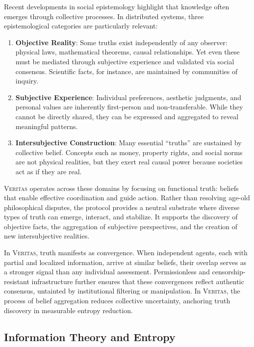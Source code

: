 \documentclass[11pt,a4paper]{article}
\newcommand{\veritas}{\textsc{Veritas}}
\begin{document}
Recent developments in social epistemology \cite{goldman1987foundations,goldman1999knowledge,kitcher1990division} highlight that knowledge often emerges through collective processes. In distributed systems, three epistemological categories are particularly relevant:

\begin{enumerate}
\item \textbf{Objective Reality}: Some truths exist independently of any observer: physical laws, mathematical theorems, causal relationships. Yet even these must be mediated through subjective experience and validated via social consensus. Scientific facts, for instance, are maintained by communities of inquiry.

\item \textbf{Subjective Experience}: Individual preferences, aesthetic judgments, and personal values are inherently first-person and non-transferable. While they cannot be directly shared, they can be expressed and aggregated to reveal meaningful patterns.

\item \textbf{Intersubjective Construction}: Many essential ``truths'' are sustained by collective belief. Concepts such as money, property rights, and social norms are not physical realities, but they exert real causal power because societies act as if they are real.
\end{enumerate}

\veritas{} operates across these domains by focusing on functional truth: beliefs that enable effective coordination and guide action. Rather than resolving age-old philosophical disputes, the protocol provides a neutral substrate where diverse types of truth can emerge, interact, and stabilize. It supports the discovery of objective facts, the aggregation of subjective perspectives, and the creation of new intersubjective realities.

In \veritas{}, truth manifests as convergence. When independent agents, each with partial and localized information, arrive at similar beliefs, their overlap serves as a stronger signal than any individual assessment. Permissionless and censorship-resistant infrastructure further ensures that these convergences reflect authentic consensus, untainted by institutional filtering or manipulation. In \veritas{}, the process of belief aggregation reduces collective uncertainty, anchoring truth discovery in measurable entropy reduction.

\subsection{Information Theory and Entropy}
\end{document}

